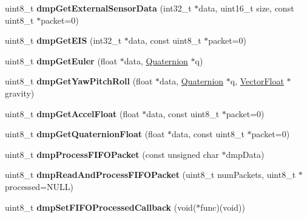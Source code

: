 \begin{DoxyCompactItemize}
uint8\+\_\+t {\bfseries dmp\+Get\+External\+Sensor\+Data} (int32\+\_\+t $\ast$data, uint16\+\_\+t size, const uint8\+\_\+t $\ast$packet=0)
\item 
\mbox{\label{classMPU6050_aa57210108896ae4ed01147fac40592e8}} 
uint8\+\_\+t {\bfseries dmp\+Get\+E\+IS} (int32\+\_\+t $\ast$data, const uint8\+\_\+t $\ast$packet=0)
\item 
\mbox{\label{classMPU6050_ac2bac2a88ecdca4e0aa399c9d93e4cc3}} 
uint8\+\_\+t {\bfseries dmp\+Get\+Euler} (float $\ast$data, \mbox{\hyperlink{classQuaternion}{Quaternion}} $\ast$q)
\item 
\mbox{\label{classMPU6050_a4e8c0d64e9ad7266b1a7970bb38d6b27}} 
uint8\+\_\+t {\bfseries dmp\+Get\+Yaw\+Pitch\+Roll} (float $\ast$data, \mbox{\hyperlink{classQuaternion}{Quaternion}} $\ast$q, \mbox{\hyperlink{classVectorFloat}{Vector\+Float}} $\ast$gravity)
\item 
\mbox{\label{classMPU6050_a6045ca343e5b35fc454f4793b3f8eaf9}} 
uint8\+\_\+t {\bfseries dmp\+Get\+Accel\+Float} (float $\ast$data, const uint8\+\_\+t $\ast$packet=0)
\item 
\mbox{\label{classMPU6050_ab9021b9acffd400ac6d1b0d78e1a633c}} 
uint8\+\_\+t {\bfseries dmp\+Get\+Quaternion\+Float} (float $\ast$data, const uint8\+\_\+t $\ast$packet=0)
\item 
\mbox{\label{classMPU6050_a6bfac470414ede55359fc5978de72548}} 
uint8\+\_\+t {\bfseries dmp\+Process\+F\+I\+F\+O\+Packet} (const unsigned char $\ast$dmp\+Data)
\item 
\mbox{\label{classMPU6050_acd224b46caa5821bb1815ae0bd7ae326}} 
uint8\+\_\+t {\bfseries dmp\+Read\+And\+Process\+F\+I\+F\+O\+Packet} (uint8\+\_\+t num\+Packets, uint8\+\_\+t $\ast$processed=N\+U\+LL)
\item 
\mbox{\label{classMPU6050_a3dd7662a5e7ef6bfc017c1b6237960f8}} 
uint8\+\_\+t {\bfseries dmp\+Set\+F\+I\+F\+O\+Processed\+Callback} (void($\ast$func)(void))
\item 
\mbox{\label{classMPU6050_ab6b2641479b580a88dbcc36a225a1ff6}} 

\end{DoxyCompactItemize}

